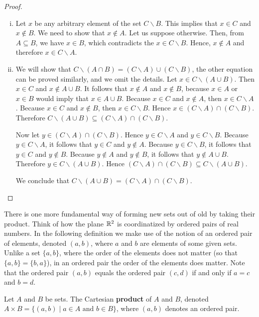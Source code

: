 \documentclass[a4paper,english,12pt]{article}
\begin{document}
\begin{proof}
\begin{enumerate} [i)]
\item Let $x$ be any arbitrary element of the set $C \backslash B$. This implies that $x \in C$ and 
$x \notin B$. We need to show that $x \notin A$. Let us suppose otherwise. Then, from $A \subseteq B$, we have $x \in B$, which contradicts the $x \in C \backslash B$. Hence, $x \notin A$ and therefore $x \in C \backslash A$.     

\item We will show that $C \backslash (A \cap B) = (C \backslash A) \cup (C \backslash B)$, the other equation can be proved similarly, and we omit the details. Let $x \in C \backslash(A \cup B)$. 
Then $x \in C$ and $x \notin A \cup B$. It follows that $x \notin A$ and $x \notin  B$, because 
$x \in A$ or $x \in B$ would imply that $x \in A \cup B$. Because $x \in C$ and $x \notin A$, then $x \in C \backslash A$. Because $x \in C$ and $x \notin B$, then $x \in C \backslash B$. Hence $x \in (C \backslash A)\cap(C \backslash B)$. Therefore $C \backslash (A \cup B) \subseteq  (C \backslash A)\cap (C \backslash B)$.

Now let $y \in (C \backslash A) \cap (C \backslash B)$. Hence $y \in C \backslash A$ and $y \in C \backslash B$. Because $y \in C \backslash A$, it follows that $y \in C$ and $y \notin A$. Because $y \in C \backslash B$, it follows that $y \in C$ and $y \notin B$.
Because $y \notin A$ and $y \notin B$, it follows that $y \notin A \cup B$. Therefore $y  \in C \backslash (A \cup B)$. Hence $(C \backslash A) \cap (C \backslash B)  \subseteq C \backslash (A \cup B)$.

We conclude that $C \backslash (A \cup B) = (C \backslash A) \cap (C \backslash B)$. 
\end{enumerate}
\end{proof}


There is one more fundamental way of forming new sets out of old by taking their product. Think of how the plane $\mathbb{R}^{2}$ is coordinatized by ordered pairs of real
numbers. In the following definition we make use of the notion of an ordered pair of elements, denoted $\left(a, b \right)$, where $a$ and $b$ are elements of
some given sets. Unlike a set $\{a, b\}$, where the order of the elements does not matter (so that $\{a, b\} = \{b, a\}$), in an ordered pair the order of the 
elements does matter. Note that the ordered pair $\left(a, b \right)$ equals the ordered pair $\left(c, d \right)$ if and only if $a = c$ and $b = d$. 

\begin{defn}
Let $A$ and $B$ be sets. The Cartesian \textbf{product} of $A$ and $B$, denoted 
$A \times B = \{ (a, b) \; | \; a \in A \text{ and } b \in B \}$, 
where $(a, b)$ denotes an ordered pair.
\end{defn}
\end{document}
